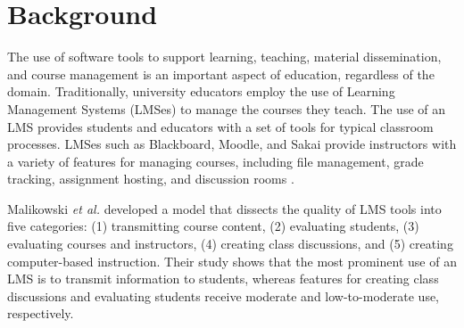 



\section{Background}
The use of software tools to support learning, teaching, material dissemination, and course management is an important aspect of education, regardless of the domain. Traditionally, university educators employ the use of Learning Management Systems (LMSes) to manage the courses they teach. The use of an LMS provides students and educators with a set of tools for typical classroom processes. LMSes such as Blackboard, Moodle, and Sakai provide instructors with a variety of features for managing courses, including file management, grade tracking, assignment hosting, and discussion rooms \cite{kumar2011comparative}.

Malikowski \emph{et al.} \cite{malikowski2007model} developed a model that dissects the quality of LMS tools into five categories: (1) transmitting course content, (2) evaluating students, (3) evaluating courses and instructors, (4) creating class discussions, and (5) creating computer-based instruction. Their study shows that the most prominent use of an LMS is to transmit information to students, whereas features for creating class discussions and evaluating students receive moderate and low-to-moderate use, respectively.

